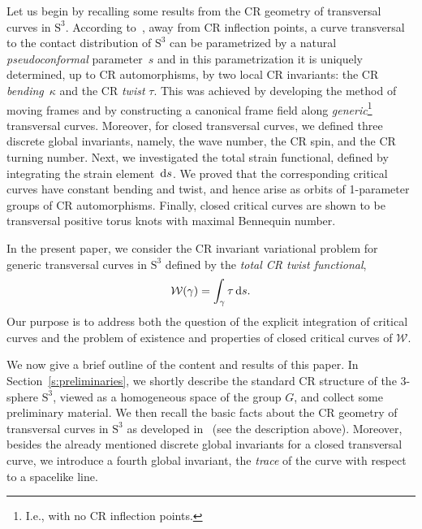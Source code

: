 \documentclass[pdftex]{sigma}
\numberwithin{equation}{section}
\begin{document}
Let us begin by recalling some results from the CR geometry
of transversal curves in $\mathrm{S}^3$.
According to~\cite{MNS-Kharkiv}, away from CR inflection points,
a curve transversal to the contact distribution of $\mathrm{S}^3$
can be parametrized by a natural \textit{pseudoconformal} parameter~$s$ and in this parametrization it is
uniquely determined, up to CR automorphisms,
by two local CR invariants: the CR \textit{bending}~$\kappa$ and the CR \textit{twist} $\tau$.
This was achieved by developing the method of moving frames and by constructing a canonical
frame field along \textit{generic}\footnote{I.e., with no CR inflection points.} transversal curves.
Moreover, for closed transversal curves, we defined three discrete global invariants, namely,
the wave number, the CR spin, and the CR turning number.
Next, we investigated the total strain functional, defined
by integrating the strain element~${\rm d}s$.
%
We proved that the corresponding critical curves have
constant bending and twist, and hence
arise as orbits of 1-parameter groups of CR automorphisms. Finally,
closed critical curves
are shown to be transversal positive torus knots with maximal Bennequin number.

In the present paper, we consider
the CR invariant variational problem for generic transversal curves in $\mathrm{S}^3$ defined by the
\textit{total CR twist functional},
\[
\mathcal{W}(\gamma) = \int_\gamma \tau \,{\rm d}s.
\]
Our purpose is to address both the question of the explicit integration of critical curves and
the problem of existence and properties of closed critical curves of $\mathcal{W}$.


We now give a brief outline of the content and results of this paper.
In Section~\ref{s:preliminaries}, we shortly describe the standard CR
structure of the 3-sphere $\mathrm{S}^3$,
viewed as a homogeneous space of the
group $G$, and collect some preliminary material. We then recall the basic facts
about the CR geometry of transversal curves in $\mathrm{S}^3$ as
developed in~\cite{MNS-Kharkiv} (see the description above).
%
Moreover, besides the already mentioned discrete global invariants for a closed transversal curve,
we introduce a fourth global invariant, the \textit{trace} of the curve with respect to a spacelike line.
\end{document}
